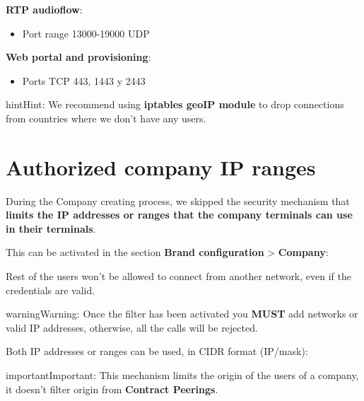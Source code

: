 \documentclass[letterpaper,10pt,english]{sphinxmanual}
\begin{document}
\textbf{RTP audioflow}:
\begin{itemize}
\item {} 
Port range 13000-19000 UDP

\end{itemize}

\textbf{Web portal and provisioning}:
\begin{itemize}
\item {} 
Ports TCP 443, 1443 y 2443

\end{itemize}

\begin{notice}{hint}{Hint:}
We recommend using \textbf{iptables geoIP module} to drop connections from
countries where we don't have any users.
\end{notice}


\section{Authorized company IP ranges}
\label{security/index:authorized-company-ip-ranges}
During the Company creating process, we skipped the security mechanism that
\textbf{limits the IP addresses or ranges that the company terminals can use
in their terminals}.

This can be activated in the section \textbf{Brand configuration} \textgreater{} \textbf{Company}:


Rest of the users won't be allowed to connect from another network, even if the
credentials are valid.

\begin{notice}{warning}{Warning:}
Once the filter has been activated you \textbf{MUST} add networks or
valid IP addresses, otherwise, all the calls will be rejected.
\end{notice}

\noindent{}

Both IP addresses or ranges can be used, in CIDR format (IP/mask):

\noindent{}

\begin{notice}{important}{Important:}
This mechanism limits the origin of the users of a company, it
doesn't filter origin from \textbf{Contract Peerings}.
\end{notice}
\end{document}
